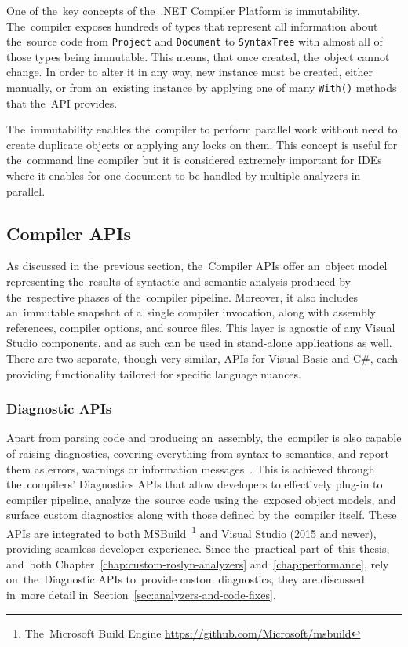 \documentclass[
  digital, %
  table,   %
  lof,     %
  lot,     %
  oneside,
]{fithesis3}
\begin{document}
One of the~key concepts of the~.NET Compiler Platform is immutability. The~compiler exposes hundreds of types that represent all information about the~source code from \texttt{Project} and \texttt{Document} to \texttt{SyntaxTree} with almost all of those types being immutable. This means, that once created, the~object cannot change. In order to alter it in any way, new instance must be created, either manually, or from an~existing instance by applying one of many \texttt{With()} methods that the~API provides.

The~immutability enables the~compiler to perform parallel work without need to create duplicate objects or applying any locks on them. This concept is useful for the~command line compiler but it is considered extremely important for IDEs where it enables for one document to be handled by multiple analyzers in parallel.

\subsection{Compiler APIs}
As discussed in the~previous section, the~Compiler APIs offer an~object model representing the~results of syntactic and semantic analysis produced by the~respective phases of the~compiler pipeline. Moreover, it also includes an~immutable snapshot of a~single compiler invocation, along with assembly references, compiler options, and source files. This layer is agnostic of any Visual Studio components, and as such can be used in stand-alone applications as well. There are two separate, though very similar, APIs for Visual Basic and C\#, each providing functionality tailored for specific language nuances.

\subsubsection{\textbf{Diagnostic APIs}}
Apart from parsing code and producing an~assembly, the~compiler is also capable of raising diagnostics, covering everything from syntax to semantics, and report them as errors, warnings or information messages~\cite{roslyn-succinctly}. This is achieved through the~compilers' Diagnostics APIs that allow developers to effectively plug-in to compiler pipeline, analyze the~source code using the~exposed object models, and surface custom diagnostics along with those defined by the~compiler itself. These APIs are integrated to both MSBuild~\footnote{The~Microsoft Build Engine \url{https://github.com/Microsoft/msbuild}} and Visual Studio (2015 and newer), providing seamless developer experience. Since the~practical part of~this thesis, and~both Chapter~\ref{chap:custom-roslyn-analyzers} and~\ref{chap:performance}, rely on~the~Diagnostic APIs to~provide custom diagnostics, they are discussed in~more detail in~Section~\ref{sec:analyzers-and-code-fixes}.
\end{document}
